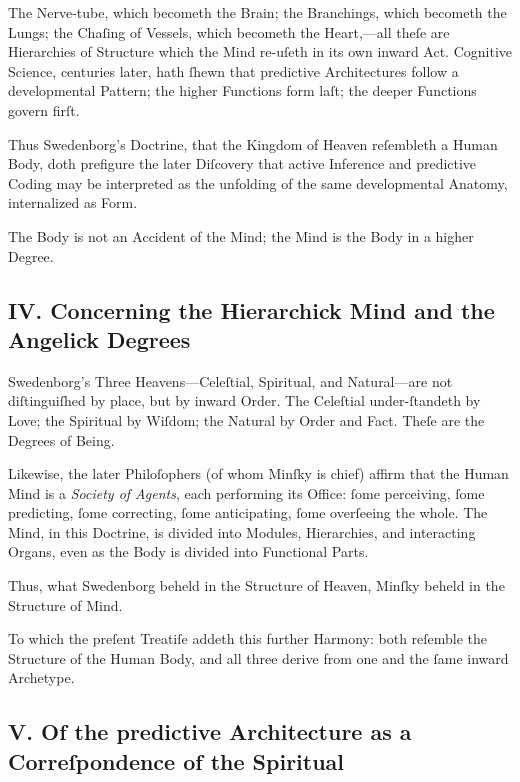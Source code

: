 \documentclass[12pt]{article}
\begin{document}
The Nerve-tube, which becometh the Brain; the Branchings, which becometh the 
Lungs; the Chaſing of Vessels, which becometh the Heart,—all theſe are 
Hierarchies of Structure which the Mind re-uſeth in its own inward Act. 
Cognitive Science, centuries later, hath ſhewn that predictive Architectures 
follow a developmental Pattern; the higher Functions form laſt; the deeper 
Functions govern firſt.

Thus Swedenborg’s Doctrine, that the Kingdom of Heaven reſembleth a Human 
Body, doth prefigure the later Diſcovery that active Inference and predictive 
Coding may be interpreted as the unfolding of the same developmental Anatomy, 
internalized as Form.

The Body is not an Accident of the Mind; the Mind is the Body in a higher 
Degree.

\subsection*{IV. Concerning the Hierarchick Mind and the Angelick Degrees}

Swedenborg’s Three Heavens—Celeſtial, Spiritual, and Natural—are not 
diſtinguiſhed by place, but by inward Order. The Celeſtial under-ſtandeth by 
Love; the Spiritual by Wiſdom; the Natural by Order and Fact. Theſe are the 
Degrees of Being.

Likewise, the later Philoſophers (of whom Minſky is chief) affirm that the 
Human Mind is a \textit{Society of Agents}, each performing its Office: ſome 
perceiving, ſome predicting, ſome correcting, ſome anticipating, ſome 
overſeeing the whole. The Mind, in this Doctrine, is divided into Modules, 
Hierarchies, and interacting Organs, even as the Body is divided into 
Functional Parts.

Thus, what Swedenborg beheld in the Structure of Heaven, Minſky beheld in the 
Structure of Mind.

To which the preſent Treatiſe addeth this further Harmony: both reſemble the 
Structure of the Human Body, and all three derive from one and the ſame inward 
Archetype.

\subsection*{V. Of the predictive Architecture as a Correſpondence of the Spiritual}
\end{document}
